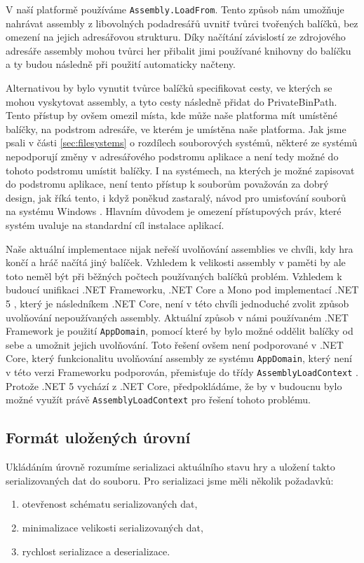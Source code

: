 V naší platformě používáme \texttt{Assembly.LoadFrom}. Tento způsob nám umožňuje nahrávat assembly z libovolných podadresářů uvnitř tvůrci tvořených balíčků, bez omezení na jejich adresářovou strukturu. Díky načítání závislostí ze zdrojového adresáře assembly mohou tvůrci her přibalit jimi používané knihovny do balíčku a ty budou následně při použití automaticky načteny.

Alternativou by bylo vynutit tvůrce balíčků specifikovat cesty, ve kterých se mohou vyskytovat assembly, a tyto cesty následně přidat do PrivateBinPath. Tento přístup by ovšem omezil místa, kde může naše platforma mít umístěné balíčky, na podstrom adresáře, ve kterém je umístěna naše platforma. Jak jsme psali v části \ref{sec:filesystems} o rozdílech souborových systémů, některé ze systémů nepodporují změny v adresářového podstromu aplikace a není tedy možné do tohoto podstromu umístit balíčky. I na systémech, na kterých je možné zapisovat do podstromu aplikace, není tento přístup k souborům považován za dobrý design, jak říká tento, i když poněkud zastaralý, návod pro umisťování souborů na systému Windows \citep{site:windowsappfiles}. Hlavním důvodem je omezení přístupových práv, které systém uvaluje na standardní cíl instalace aplikací.

Naše aktuální implementace nijak neřeší uvolňování assemblies ve chvíli, kdy hra končí a hráč načítá jiný balíček. Vzhledem k velikosti assembly v paměti by ale toto neměl být při běžných počtech používaných balíčků problém. Vzhledem k budoucí unifikaci .NET Frameworku, .NET Core a Mono pod implementací .NET 5 \citep{site:dotnet5}, který je následníkem .NET Core, není v této chvíli jednoduché zvolit způsob uvolňování nepoužívaných assembly. Aktuální způsob v námi používaném .NET Framework je použití \texttt{AppDomain}, pomocí které by bylo možné oddělit balíčky od sebe a umožnit jejich uvolňování. Toto řešení ovšem není podporované v .NET Core, který funkcionalitu uvolňování assembly ze systému \texttt{AppDomain}, který není v této verzi Frameworku podporován, přemisťuje do třídy \texttt{AssemblyLoadContext} \citep{site:assloadcontext}. Protože .NET 5 vychází z .NET Core, předpokládáme, že by v budoucnu bylo možné využít právě \texttt{AssemblyLoadContext} pro řešení tohoto problému. 

\subsection{Formát uložených úrovní}
\label{sec:savingformat}
Ukládáním úrovně rozumíme serializaci aktuálního stavu hry a uložení takto serializovaných dat do souboru. Pro serializaci jsme měli několik požadavků: 
\begin{enumerate}
	\item otevřenost schématu serializovaných dat,
	\item minimalizace velikosti serializovaných dat,
	\item rychlost serializace a deserializace.
\end{enumerate}

